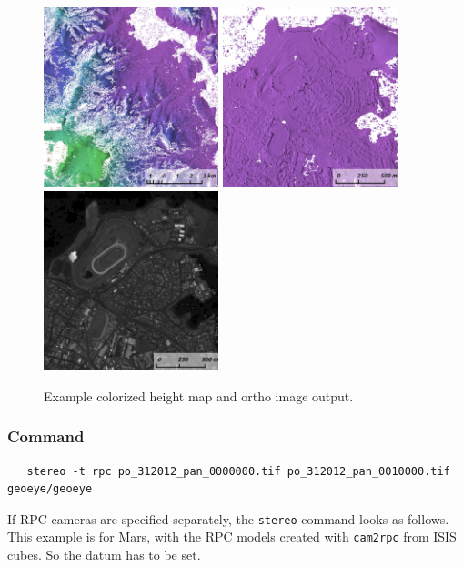 \begin{figure}[h!]
\centering
  \includegraphics[width=2.0in]{images/examples/geoeye/GeoEye_ContextRender_400px.png}
  \includegraphics[width=2.0in]{images/examples/geoeye/GeoEye_CloseUp_400px.png}
  \includegraphics[width=2.0in]{images/examples/geoeye/GeoEye_CloseUpDRG_400px.png}
\caption{Example colorized height map and ortho image output.}
\label{fig:geoeye-nomap-example}
\end{figure}

\subsubsection*{Command}

\begin{verbatim}
   stereo -t rpc po_312012_pan_0000000.tif po_312012_pan_0010000.tif geoeye/geoeye
\end{verbatim}

If RPC cameras are specified separately, the \texttt{stereo} command
looks as follows. This example is for Mars, with the RPC models created
with \texttt{cam2rpc} from ISIS cubes.  So the datum has to be set.

